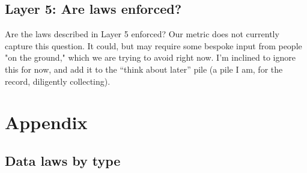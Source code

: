 \documentclass[11pt]{article}
\begin{document}
\subsection{Layer 5: Are laws enforced?}
\label{sec:orge9e06a3}

Are the laws described in Layer 5 enforced? Our metric does not currently
capture this question. It could, but may require some bespoke input from people
"on the ground," which we are trying to avoid right now. I'm inclined to ignore
this for now, and add it to the ``think about later'' pile (a pile I am, for the
record, diligently collecting).

\section{Appendix}
\label{sec:org0c4318b}

\subsection{Data laws by type}
\label{sec:orgeacce21}
\label{org827f471}
\end{document}
